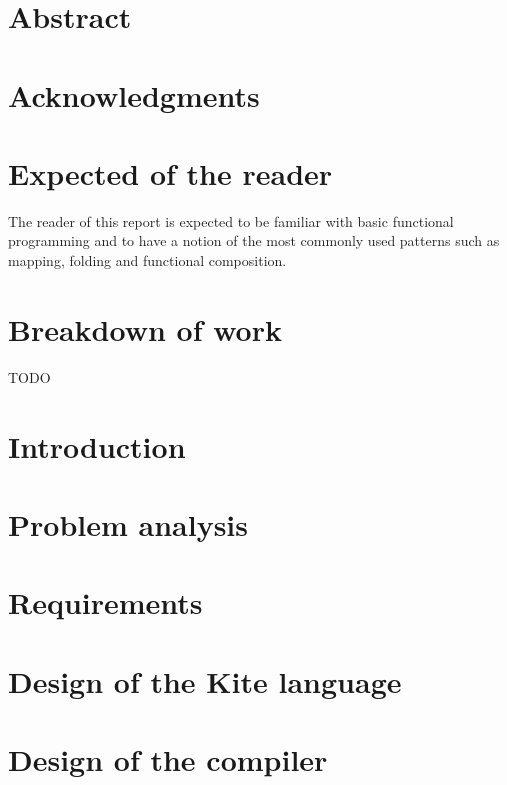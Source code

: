 \documentclass{article}
\begin{document}

\clearpage

\section*{Abstract}
\label{sec:abstract}

\clearpage

\section*{Acknowledgments}
\label{sec:acknow}


\section*{Expected of the reader}
The reader of this report is expected to be familiar with basic functional programming and to have a notion of the most commonly used patterns such as mapping, folding and functional composition.


\section*{Breakdown of work}
TODO
\clearpage

\tableofcontents
\clearpage

\section{Introduction}
\label{sec:intro}

\clearpage

\section{Problem analysis}
\label{sec:probanal}

\clearpage

\section{Requirements}
\label{sec:requirements}

\clearpage

\section{Design of the Kite language}
\label{sec:kite-design}

\clearpage

\section{Design of the compiler}
\label{sec:compiler-design}

\clearpage
\end{document}
